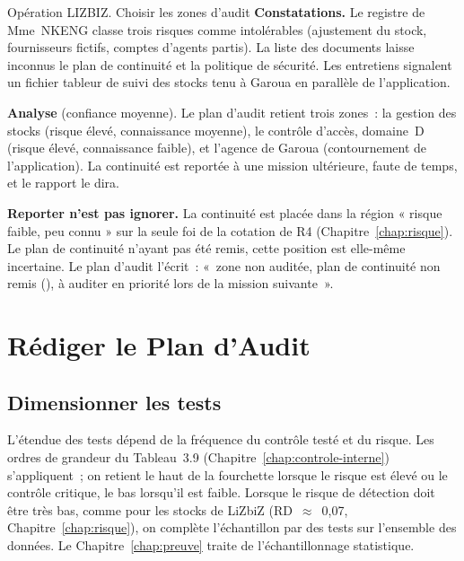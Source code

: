 \begin{boxscenario}{Opération LIZBIZ. Choisir les zones d'audit}
\textbf{Constatations.} Le registre de Mme~NKENG classe trois risques comme
intolérables (ajustement du stock, fournisseurs fictifs, comptes d'agents
partis). La liste des documents laisse inconnus le plan de continuité et la
politique de sécurité. Les entretiens signalent un fichier tableur de suivi
des stocks tenu à Garoua en parallèle de l'application.

\medskip
\textbf{Analyse} (confiance moyenne). Le plan d'audit retient trois zones~:
la gestion des stocks (risque élevé, connaissance moyenne), le contrôle
d'accès, domaine~D (risque élevé, connaissance faible), et l'agence de
Garoua (contournement de l'application). La continuité est reportée à une
mission ultérieure, faute de temps, et le rapport le dira.
\end{boxscenario}

\begin{boxinfo}
\textbf{Reporter n'est pas ignorer.} La continuité est placée dans la
région « risque faible, peu connu » sur la seule foi de la cotation de R4
(Chapitre~\ref{chap:risque}). Le plan de continuité n'ayant pas été remis,
cette position est elle-même incertaine. Le plan d'audit l'écrit~: «~zone
non auditée, plan de continuité non remis (\NEK{}), à auditer en
priorité lors de la mission suivante~».
\end{boxinfo}

\section{Rédiger le Plan d'Audit}
\label{sec:c08-plan}

\subsection{Dimensionner les tests}

L'étendue des tests dépend de la fréquence du contrôle testé et du risque.
Les ordres de grandeur du Tableau~3.9 (Chapitre~\ref{chap:controle-interne})
s'appliquent~; on retient le haut de la fourchette lorsque le risque est
élevé ou le contrôle critique, le bas lorsqu'il est faible. Lorsque le
risque de détection doit être très bas, comme pour les stocks de LiZbiZ
(RD~$\approx$~0,07, Chapitre~\ref{chap:risque}), on complète l'échantillon
par des tests sur l'ensemble des données. Le Chapitre~\ref{chap:preuve}
traite de l'échantillonnage statistique.

